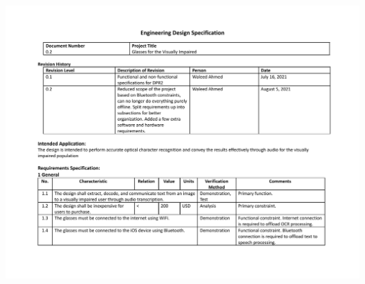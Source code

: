 \documentclass[a4paper,11pt]{article}
\begin{document}
\begin{landscape}
\begin{center}
        \includegraphics[page=3,width={0.86\linewidth}]{pdf/eds_0.2.pdf}
    \end{center}
    
    \newpage

\end{landscape}
\end{document}

